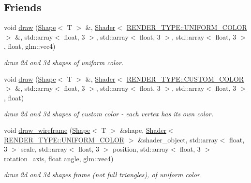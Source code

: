 \subsection*{Friends}
\begin{DoxyCompactItemize}
\item 
void \mbox{\hyperlink{classShape_a0f7d9c8330ae4f062c6f569a7400e1f0}{draw}} (\mbox{\hyperlink{classShape}{Shape}}$<$ T $>$ \&, \mbox{\hyperlink{classShader}{Shader}}$<$ \mbox{\hyperlink{render_8hpp_a24e288e18eb7b6e01de7565001fedb60aa98862073f71a928bad5099cc3e1c2ed}{R\+E\+N\+D\+E\+R\+\_\+\+T\+Y\+P\+E\+::\+U\+N\+I\+F\+O\+R\+M\+\_\+\+C\+O\+L\+OR}} $>$ \&, std\+::array$<$ float, 3 $>$, std\+::array$<$ float, 3 $>$, std\+::array$<$ float, 3 $>$, float, glm\+::vec4)
\begin{DoxyCompactList}\small\item\em draw 2d and 3d shapes of uniform color. \end{DoxyCompactList}\item 
void \mbox{\hyperlink{classShape_a29e514c040e0781bfa2e08bcde4a7557}{draw}} (\mbox{\hyperlink{classShape}{Shape}}$<$ T $>$ \&, \mbox{\hyperlink{classShader}{Shader}}$<$ \mbox{\hyperlink{render_8hpp_a24e288e18eb7b6e01de7565001fedb60a9d34355b5a26c54b5dbab1e45245a6f4}{R\+E\+N\+D\+E\+R\+\_\+\+T\+Y\+P\+E\+::\+C\+U\+S\+T\+O\+M\+\_\+\+C\+O\+L\+OR}} $>$ \&, std\+::array$<$ float, 3 $>$, std\+::array$<$ float, 3 $>$, std\+::array$<$ float, 3 $>$, float)
\begin{DoxyCompactList}\small\item\em draw 2d and 3d shapes of custom color -\/ each vertex has it\textquotesingle{}s own color. \end{DoxyCompactList}\item 
void \mbox{\hyperlink{classShape_ad57e4dd441b60269c43114f31ffa6085}{draw\+\_\+wireframe}} (\mbox{\hyperlink{classShape}{Shape}}$<$ T $>$ \&shape, \mbox{\hyperlink{classShader}{Shader}}$<$ \mbox{\hyperlink{render_8hpp_a24e288e18eb7b6e01de7565001fedb60aa98862073f71a928bad5099cc3e1c2ed}{R\+E\+N\+D\+E\+R\+\_\+\+T\+Y\+P\+E\+::\+U\+N\+I\+F\+O\+R\+M\+\_\+\+C\+O\+L\+OR}} $>$ \&shader\+\_\+object, std\+::array$<$ float, 3 $>$ scale, std\+::array$<$ float, 3 $>$ position, std\+::array$<$ float, 3 $>$ rotation\+\_\+axis, float angle, glm\+::vec4)
\begin{DoxyCompactList}\small\item\em draw 2d and 3d shapes frame (not full triangles), of uniform color. \end{DoxyCompactList}\item 

\end{DoxyCompactItemize}
